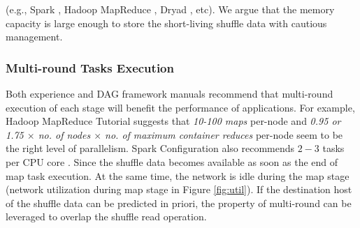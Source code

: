 (e.g., Spark \cite{apachespark}, Hadoop MapReduce \cite{hadoop}, Dryad \cite{dryad}, etc).
We argue that the memory capacity is large enough to store the short-living shuffle data with cautious management.

\subsubsection{Multi-round Tasks Execution}\label{multi}
Both experience and DAG framework manuals recommend that multi-round execution of each stage will benefit the performance of applications.
\ifrevision
\reversemarginpar
{}
\fi
For example, Hadoop MapReduce Tutorial \cite{hadooptutorial} suggests that \textit{10-100 maps} per-node and \textit{0.95 or 1.75 $\times$ no. of nodes $\times$ no. of maximum container reduces} per-node seem to be the right level of parallelism. 
Spark Configuration also recommends $2-3$ tasks per CPU core \cite{sparkconf}.
Since the shuffle data becomes available as soon as the end of map task execution. 
At the same time, the network is idle during the map stage (network utilization during map stage in Figure \ref{fig:util}). 
If the destination host of the shuffle data can be predicted in priori, the property of multi-round can be leveraged to overlap the shuffle read operation.

